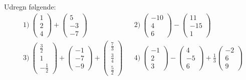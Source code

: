 Udregn følgende:
\begin{align*}
	&1) \ 
	\begin{pmatrix}
		1 \\ 2 \\ 4
	\end{pmatrix} + 
	\begin{pmatrix}
		5 \\ -3 \\ -7	
	\end{pmatrix}	 
	&&2) \  
	\begin{pmatrix}
		-10 \\ 4 \\ 6
	\end{pmatrix} - 
	\begin{pmatrix}
		11 \\ -15 \\ 1	
	\end{pmatrix}	 \\
	&3) \ 
	\begin{pmatrix}
		\frac{3}{2} \\ 1 \\ -\frac{1}{2}
	\end{pmatrix} + 
	\begin{pmatrix}
		-1 \\ -7 \\ -9	
	\end{pmatrix} +
	\begin{pmatrix}
		\frac{7}{3} \\ \frac{3}{4} \\ \frac{5}{2}	
	\end{pmatrix}	 
	&&4) \  
	\begin{pmatrix}
		-1 \\ 2 \\ 3
	\end{pmatrix} - 
	\begin{pmatrix}
		4 \\ -5 \\ 6	
	\end{pmatrix}+ \frac{1}{3}
	\begin{pmatrix}
		-2 \\ 6 \\ 9
	\end{pmatrix}
\end{align*}

